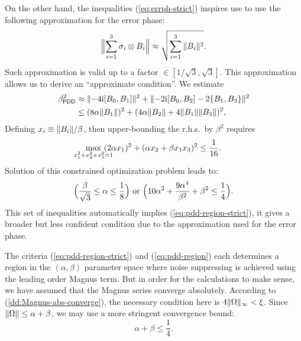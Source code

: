 \documentclass[aps,pra,reprint,superscriptaddress]{revtex4-2}
\begin{document}
On the other hand, the inequalities (\ref{eq:errph-strict}) 
inspires use to use the following approximation for the error phase:
\begin{equation}\label{eq:errph-approx}
    \norm[\Big]{\sum_{i=1}^3 \sigma_i \otimes B_i} \approx \sqrt{\sum_{i=1}^3 \norm{B_i}^2}.
\end{equation}
Such approximation is valid up to a factor $\in[1/\sqrt{3},\sqrt{3}]$.
This approximation allows us to derive an ``approximate condition''. 
We estimate
\begin{align}\label{eq:beta2-pdd-estimate}
\beta_\mathsf{PDD}^2 & \approx
\norm{-4\upi  [B_0,B_1]}^2 +\norm{-2\upi  [B_0,B_2] - 2 \{B_1,B_3\}}^2 \notag \\
&\le (8\alpha \norm{B_1})^2 + (4\alpha\norm{B_2} + 4\norm{B_1}\norm{B_3})^2,
\end{align}
Defining $x_i\equiv\norm{B_i}/\beta$, then upper-bounding the r.h.s.\  by $\beta^2$ requires
\begin{equation}\label{eq:PDD-optimization}
\max_{\mathclap{x_1^2+x_2^2+x_3^2=1}} \  (2 \alpha x_1)^2 + (\alpha x_2 + \beta x_1 x_3)^2\le \frac{1}{16}.
\end{equation} 
Solution of this constrained optimization problem leads to:
\begin{equation}\label{eq:pdd-region}
\begin{aligned}
\Bigl(\frac{\beta}{\sqrt{3}}\le \alpha \le \frac{1}{8} \Bigr)
\ \mathrm{or}\ \Bigl(10 \alpha ^2+\frac{9 \alpha ^4}{\beta ^2}+\beta ^2\leq \frac{1}{4}\Bigr). 
\end{aligned}   
\end{equation}
This set of inequalities automatically implies (\ref{eq:pdd-region-strict}),
it gives a broader but less confident condition due to the approximation used
for the error phase.


The criteria (\ref{eq:pdd-region-strict}) and (\ref{eq:pdd-region}) each determines a region in the $(\alpha,\beta)$ parameter space where noise suppressing is achieved using the leading order Magnus term. 
But in order for the calculations to make sense, we have assumed that the Magnus series converge absolutely. According to (\ref{dd:Magnus-abs-converge}), the necessary condition here is $4 \norm{\Omega}_\infty   < \xi$.
Since $\norm{\Omega} \le \alpha +\beta$, we may use 
a more stringent convergence bound:
\begin{equation}\label{dd:PDD-magnus-abs}
    \alpha +\beta \le \frac{1}{4}.
\end{equation}
\end{document}
